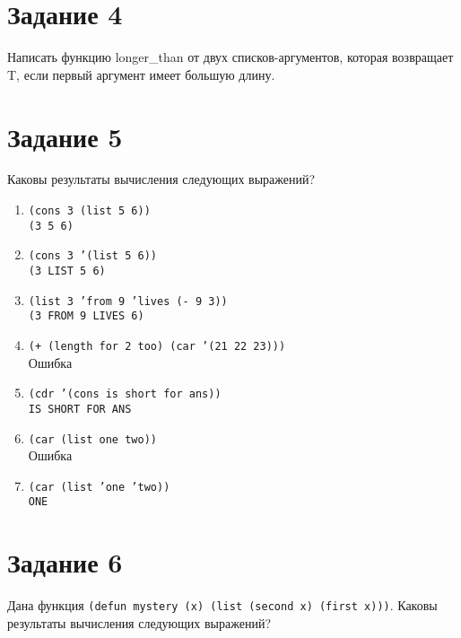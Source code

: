 \section{Задание 4}

Написать функцию longer\_than от двух списков-аргументов, которая возвращает T, если первый аргумент имеет большую длину.


\section{Задание 5}

Каковы результаты вычисления следующих выражений?

\begin{enumerate}
	\item \texttt{(cons 3 (list 5 6))}
	\\ \texttt{(3 5 6)}
	
	\item \texttt{(cons 3 '(list 5 6))}
	\\ \texttt{(3 LIST 5 6)}
	
	\item \texttt{(list 3 'from 9 'lives (- 9 3))}
	\\ \texttt{(3 FROM 9 LIVES 6)}
	
	\item \texttt{(+ (length for 2 too) (car '(21 22 23)))}
	\\ Ошибка
	
	\item \texttt{(cdr '(cons is short for ans))}
	\\ \texttt{IS SHORT FOR ANS}
	
	\item \texttt{(car (list one two))}
	\\ Ошибка
	
	\item \texttt{(car (list 'one 'two))}
	\\ \texttt{ONE}
\end{enumerate}

\section{Задание 6}

Дана функция \texttt{(defun mystery (x) (list (second x) (first x)))}.
Каковы результаты вычисления следующих выражений?

